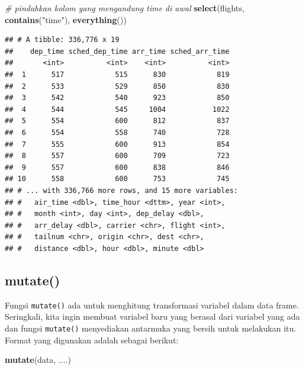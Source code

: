 \documentclass[]{book}
\newenvironment{Shaded}{\begin{snugshade}}{\end{snugshade}}
\newcommand{\KeywordTok}[1]{\textcolor[rgb]{0.13,0.29,0.53}{\textbf{#1}}}
\newcommand{\StringTok}[1]{\textcolor[rgb]{0.31,0.60,0.02}{#1}}
\newcommand{\CommentTok}[1]{\textcolor[rgb]{0.56,0.35,0.01}{\textit{#1}}}
\newcommand{\NormalTok}[1]{#1}
\begin{document}
\begin{Shaded}
\begin{Highlighting}[]
\CommentTok{# pindahkan kolom yang mengandung time di awal}
\KeywordTok{select}\NormalTok{(flights, }\KeywordTok{contains}\NormalTok{(}\StringTok{"time"}\NormalTok{), }\KeywordTok{everything}\NormalTok{())}
\end{Highlighting}
\end{Shaded}

\begin{verbatim}
## # A tibble: 336,776 x 19
##    dep_time sched_dep_time arr_time sched_arr_time
##       <int>          <int>    <int>          <int>
##  1      517            515      830            819
##  2      533            529      850            830
##  3      542            540      923            850
##  4      544            545     1004           1022
##  5      554            600      812            837
##  6      554            558      740            728
##  7      555            600      913            854
##  8      557            600      709            723
##  9      557            600      838            846
## 10      558            600      753            745
## # ... with 336,766 more rows, and 15 more variables:
## #   air_time <dbl>, time_hour <dttm>, year <int>,
## #   month <int>, day <int>, dep_delay <dbl>,
## #   arr_delay <dbl>, carrier <chr>, flight <int>,
## #   tailnum <chr>, origin <chr>, dest <chr>,
## #   distance <dbl>, hour <dbl>, minute <dbl>
\end{verbatim}

\subsection{mutate()}\label{mutate}

Fungsi \texttt{mutate()} ada untuk menghitung transformasi variabel
dalam data frame. Seringkali, kita ingin membuat variabel baru yang
berasal dari variabel yang ada dan fungsi \texttt{mutate()} menyediakan
antarmuka yang bersih untuk melakukan itu. Format yang digunakan adalah
sebagai berikut:

\begin{Shaded}
\begin{Highlighting}[]
\KeywordTok{mutate}\NormalTok{(data, ....)}
\end{Highlighting}
\end{Shaded}
\end{document}
